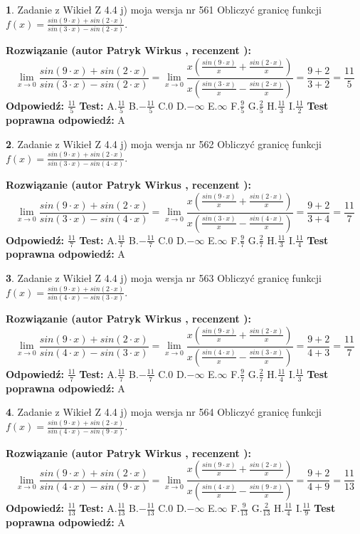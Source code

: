 \documentclass[12pt, a4paper]{article}
\theoremstyle{definition} %
\newtheorem{zad}{}
\newcommand{\zadStart}[1]{\begin{zad}#1\newline}
\newcommand{\zadStop}{\end{zad}}
\newcommand{\rozwStart}[2]{\noindent \textbf{Rozwiązanie (autor #1 , recenzent #2): }\newline}
\newcommand{\rozwStop}{\newline}
\newcommand{\odpStart}{\noindent \textbf{Odpowiedź:}\newline}
\newcommand{\odpStop}{\newline}
\newcommand{\testStart}{\noindent \textbf{Test:}\newline}
\newcommand{\testStop}{\newline}
\newcommand{\kluczStart}{\noindent \textbf{Test poprawna odpowiedź:}\newline}
\newcommand{\kluczStop}{\newline}
\begin{document}
\zadStart{Zadanie z Wikieł Z 4.4 j) moja wersja nr 561}
Obliczyć granicę funkcji $f(x)=\frac{sin(9\cdot x) +sin(2\cdot x)}{sin(3\cdot x) -sin(2\cdot x)}$.
\zadStop
\rozwStart{Patryk Wirkus}{}
$$\lim\limits_{x\to 0}\frac{sin(9\cdot x) +sin(2\cdot x)}{sin(3\cdot x) -sin(2\cdot x)}=\lim\limits_{x\to 0}\frac{x(\frac{sin(9\cdot x)}{x}+\frac{sin(2\cdot x)}{x})}{x(\frac{sin(3\cdot x)}{x}-\frac{sin(2\cdot x)}{x})}=\frac{9+2}{3+2} = \frac{11}{5}$$
\rozwStop
\odpStart
$\frac{11}{5}$
\odpStop
\testStart
A.$\frac{11}{5}$
B.$-\frac{11}{5}$
C.$0$
D.$-\infty$
E.$\infty$
F.$\frac{9}{5}$
G.$\frac{2}{5}$
H.$\frac{11}{3}$
I.$\frac{11}{2}$
\testStop
\kluczStart
A
\kluczStop



\zadStart{Zadanie z Wikieł Z 4.4 j) moja wersja nr 562}
Obliczyć granicę funkcji $f(x)=\frac{sin(9\cdot x) +sin(2\cdot x)}{sin(3\cdot x) -sin(4\cdot x)}$.
\zadStop
\rozwStart{Patryk Wirkus}{}
$$\lim\limits_{x\to 0}\frac{sin(9\cdot x) +sin(2\cdot x)}{sin(3\cdot x) -sin(4\cdot x)}=\lim\limits_{x\to 0}\frac{x(\frac{sin(9\cdot x)}{x}+\frac{sin(2\cdot x)}{x})}{x(\frac{sin(3\cdot x)}{x}-\frac{sin(4\cdot x)}{x})}=\frac{9+2}{3+4} = \frac{11}{7}$$
\rozwStop
\odpStart
$\frac{11}{7}$
\odpStop
\testStart
A.$\frac{11}{7}$
B.$-\frac{11}{7}$
C.$0$
D.$-\infty$
E.$\infty$
F.$\frac{9}{7}$
G.$\frac{2}{7}$
H.$\frac{11}{3}$
I.$\frac{11}{4}$
\testStop
\kluczStart
A
\kluczStop



\zadStart{Zadanie z Wikieł Z 4.4 j) moja wersja nr 563}
Obliczyć granicę funkcji $f(x)=\frac{sin(9\cdot x) +sin(2\cdot x)}{sin(4\cdot x) -sin(3\cdot x)}$.
\zadStop
\rozwStart{Patryk Wirkus}{}
$$\lim\limits_{x\to 0}\frac{sin(9\cdot x) +sin(2\cdot x)}{sin(4\cdot x) -sin(3\cdot x)}=\lim\limits_{x\to 0}\frac{x(\frac{sin(9\cdot x)}{x}+\frac{sin(2\cdot x)}{x})}{x(\frac{sin(4\cdot x)}{x}-\frac{sin(3\cdot x)}{x})}=\frac{9+2}{4+3} = \frac{11}{7}$$
\rozwStop
\odpStart
$\frac{11}{7}$
\odpStop
\testStart
A.$\frac{11}{7}$
B.$-\frac{11}{7}$
C.$0$
D.$-\infty$
E.$\infty$
F.$\frac{9}{7}$
G.$\frac{2}{7}$
H.$\frac{11}{4}$
I.$\frac{11}{3}$
\testStop
\kluczStart
A
\kluczStop



\zadStart{Zadanie z Wikieł Z 4.4 j) moja wersja nr 564}
Obliczyć granicę funkcji $f(x)=\frac{sin(9\cdot x) +sin(2\cdot x)}{sin(4\cdot x) -sin(9\cdot x)}$.
\zadStop
\rozwStart{Patryk Wirkus}{}
$$\lim\limits_{x\to 0}\frac{sin(9\cdot x) +sin(2\cdot x)}{sin(4\cdot x) -sin(9\cdot x)}=\lim\limits_{x\to 0}\frac{x(\frac{sin(9\cdot x)}{x}+\frac{sin(2\cdot x)}{x})}{x(\frac{sin(4\cdot x)}{x}-\frac{sin(9\cdot x)}{x})}=\frac{9+2}{4+9} = \frac{11}{13}$$
\rozwStop
\odpStart
$\frac{11}{13}$
\odpStop
\testStart
A.$\frac{11}{13}$
B.$-\frac{11}{13}$
C.$0$
D.$-\infty$
E.$\infty$
F.$\frac{9}{13}$
G.$\frac{2}{13}$
H.$\frac{11}{4}$
I.$\frac{11}{9}$
\testStop
\kluczStart
A
\kluczStop
\end{document}
